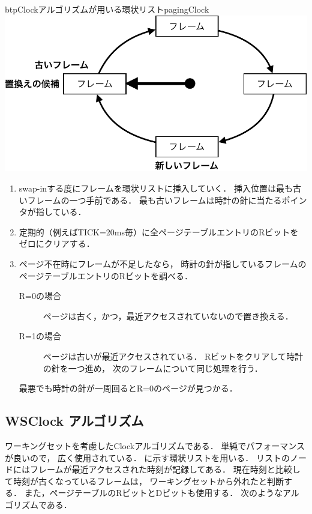\begin{myfig}{btp}{Clockアルゴリズムが用いる環状リスト}{pagingClock}
  \includegraphics[scale=0.66]{Fig/pagingClock-crop.pdf}
\end{myfig}

\begin{enumerate}
\item swap-inする度にフレームを環状リストに挿入していく．
  挿入位置は最も古いフレームの一つ手前である．
  最も古いフレームは時計の針に当たるポインタが指している．
\item 定期的（例えばTICK=20ms毎）に全ページテーブルエントリのRビットを
  ゼロにクリアする．
\item ページ不在時にフレームが不足したなら，
  時計の針が指しているフレームのページテーブルエントリのRビットを調べる．
  \begin{description}
  \item[R=0の場合]
    ページは古く，かつ，最近アクセスされていないので置き換える．
  \item[R=1の場合]
    ページは古いが最近アクセスされている．
    Rビットをクリアして時計の針を一つ進め，
    次のフレームについて同じ処理を行う．
  \end{description}
  最悪でも時計の針が一周回るとR=0のページが見つかる．
\end{enumerate}

\subsection{WSClock アルゴリズム}
ワーキングセットを考慮したClockアルゴリズムである．
単純でパフォーマンスが良いので，
広く使用されている\cite{wsClock}．
に示す環状リストを用いる．
リストのノードにはフレームが最近アクセスされた時刻が記録してある．
現在時刻と比較して時刻が古くなっているフレームは，
ワーキングセットから外れたと判断する．
また，ページテーブルのRビットとDビットも使用する．
次のようなアルゴリズムである．

